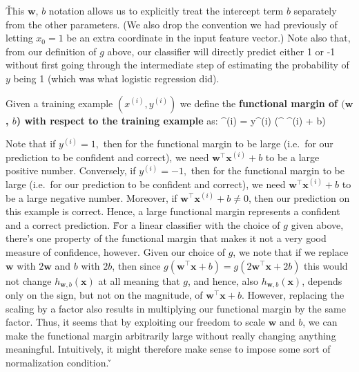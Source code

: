 \v

This $\boldsymbol{w}$, $b$ notation allows us to explicitly treat the intercept term $b$ separately from the other
parameters. (We also drop the convention we had previously of letting $x_0 = 1$ be an extra coordinate in the input
feature vector.) Note also that, from our definition of $g$ above, our classifier will directly predict either 1 or
-1 without first going through the intermediate step of estimating the probability of $y$ being 1 (which was what
logistic regression did).

Given a training example $(x^{(i)}, y^{(i)})$ we define the \textbf{functional margin of $(\boldsymbol{w}$, $b$) with
respect to the training example} as:
\bse
{\hat{\gamma}}^{(i)} = y^{(i)} (^{\intercal} ^{(i)} + b)
\ese
\ed

Note that if $y^{(i)}= 1,$ then for the functional margin to be large (i.e.\ for our prediction to be confident and
correct), we need $\boldsymbol{w}^{\intercal} \boldsymbol{x}^{(i)} + b$ to be a large positive number. Conversely, if
$y^{(i)}= -1,$ then for the functional margin to be large (i.e.\, for our prediction to be confident and correct),
we need $\boldsymbol{w}^{\intercal} \boldsymbol{x}^{(i)} + b$ to be a large negative number. Moreover, if
$\boldsymbol{w}^{\intercal} \boldsymbol{x}^{(i)} + b \neq 0$, then our prediction on this example is correct. Hence,
a large functional margin represents a confident and a correct prediction. \v

For a linear classifier with the choice of $g$ given above, there's one property of the functional margin that makes
it not a very good measure of confidence, however. Given our choice of $g$, we note that if we replace
$\boldsymbol{w}$ with $2\boldsymbol{w}$ and $b$ with $2b$, then since $g \left(\boldsymbol{w}^{\intercal} \boldsymbol{x}
+
b\right) = g\left(2\boldsymbol{w}^{\intercal} \boldsymbol{x} + 2b\right)$ this would not change $h_{\boldsymbol{w}, b}
(\boldsymbol{x})$ at all meaning that $g$, and hence, also $h_{\boldsymbol{w}, b} (\boldsymbol{x})$, depends only on
the sign, but not on the magnitude, of $\boldsymbol{w}^{\intercal} \boldsymbol{x} + b$. However, replacing the
scaling by a factor also results in multiplying our functional margin by the same factor. Thus, it seems that by
exploiting our freedom to scale $\boldsymbol{w}$ and $b$, we can make the functional margin arbitrarily large without
really changing anything meaningful. Intuitively, it might therefore make sense to impose some sort of normalization
condition. \v

